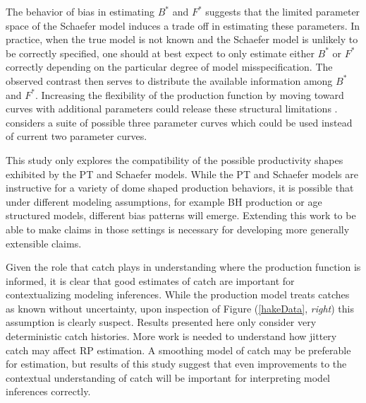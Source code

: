 \documentclass[12pt]{article}
\begin{document}
%
The behavior of bias in estimating $B^*$ and $F^*$ suggests that the limited 
parameter space of the Schaefer model induces a trade off in estimating these 
parameters. In practice, when the true model is not known and the Schaefer 
model is unlikely to be correctly specified, one should at best expect to only 
estimate either $B^*$ or $F^*$ correctly depending on the particular degree of 
model misspecification. The observed contrast then serves to distribute the 
available information among $B^*$ and $F^*$. Increasing the flexibility of the 
production function by moving toward curves with additional parameters could 
release these structural limitations . 
 considers a suite of possible three parameter
curves which could be used instead of current two parameter curves.

%
This study only explores the compatibility of the possible productivity shapes 
exhibited by the PT and Schaefer models. While the PT and Schaefer models are 
instructive for a variety of dome shaped production behaviors, %
it is possible that under different modeling assumptions, for example %
BH production or age structured models, different bias patterns 
will emerge. Extending this work to be able to make claims in those settings 
is necessary for developing more generally extensible claims. %

%
Given the role that catch plays in understanding where the production function 
is informed, it is clear that good estimates of catch are important for 
contextualizing modeling inferences. While the production model treats catches 
as known without uncertainty, upon inspection of Figure (\ref{hakeData}, \emph{right})
this assumption is clearly suspect. Results presented here only consider very 
deterministic catch histories. More work is needed to understand how jittery catch may 
affect RP estimation. A smoothing model of catch may be preferable for estimation, 
but results of this study suggest that even improvements to the contextual understanding of 
catch will be important for interpreting model inferences correctly.

\end{document}
